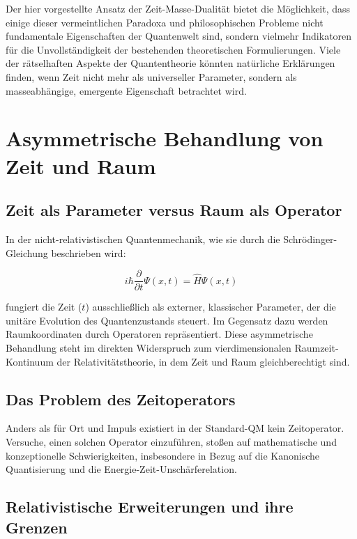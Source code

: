 \documentclass[12pt,a4paper]{article}  %
\begin{document}
	Der hier vorgestellte Ansatz der Zeit-Masse-Dualität bietet die Möglichkeit, dass einige dieser vermeintlichen Paradoxa und philosophischen Probleme nicht fundamentale Eigenschaften der Quantenwelt sind, sondern vielmehr Indikatoren für die Unvollständigkeit der bestehenden theoretischen Formulierungen. Viele der rätselhaften Aspekte der Quantentheorie könnten natürliche Erklärungen finden, wenn Zeit nicht mehr als universeller Parameter, sondern als masseabhängige, emergente Eigenschaft betrachtet wird.
	
	\section{Asymmetrische Behandlung von Zeit und Raum}
	
	\subsection{Zeit als Parameter versus Raum als Operator}
	
	In der nicht-relativistischen Quantenmechanik, wie sie durch die Schrödinger-Gleichung beschrieben wird:
	
	\begin{equation}
		i\hbar \frac{\partial}{\partial t}\Psi(x,t) = \hat{H}\Psi(x,t)
	\end{equation}
	
	fungiert die Zeit ($t$) ausschließlich als externer, klassischer Parameter, der die unitäre Evolution des Quantenzustands steuert. Im Gegensatz dazu werden Raumkoordinaten durch Operatoren repräsentiert. Diese asymmetrische Behandlung steht im direkten Widerspruch zum vierdimensionalen Raumzeit-Kontinuum der Relativitätstheorie, in dem Zeit und Raum gleichberechtigt sind.
	
	\subsection{Das Problem des Zeitoperators}
	
	Anders als für Ort und Impuls existiert in der Standard-QM kein Zeitoperator. Versuche, einen solchen Operator einzuführen, stoßen auf mathematische und konzeptionelle Schwierigkeiten, insbesondere in Bezug auf die Kanonische Quantisierung und die Energie-Zeit-Unschärferelation.
	
	\subsection{Relativistische Erweiterungen und ihre Grenzen}
	
\end{document}

